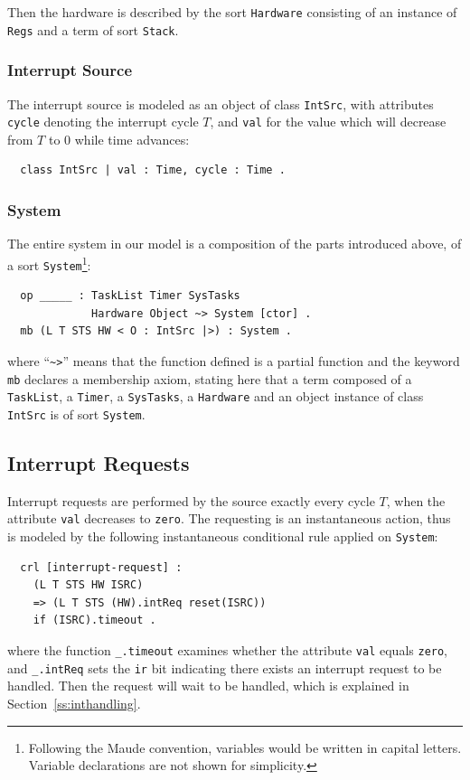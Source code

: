 \documentclass[journal]{IEEEtranTIE}
\begin{document}
Then the hardware is described by the sort \verb|Hardware| consisting
of an instance of \verb|Regs| and a term of sort \verb|Stack|.  

\subsubsection{Interrupt Source}
The interrupt source is modeled as an object of class \verb|IntSrc|,
with attributes \verb|cycle| denoting the interrupt cycle $T$, and
\verb|val| for the value which will decrease from $T$ to $0$ while
time advances:
\begin{verbatim}
  class IntSrc | val : Time, cycle : Time .
\end{verbatim}

\subsubsection{System}
The entire system in our model is a composition of the parts
introduced above, of a sort \verb|System|\footnote{Following the Maude
  convention, variables would be written in capital letters. Variable
  declarations are not shown for simplicity.}:
\begin{verbatim}
  op _____ : TaskList Timer SysTasks 
             Hardware Object ~> System [ctor] .
  mb (L T STS HW < O : IntSrc |>) : System .
\end{verbatim}
where ``\verb|~>|'' means that the function defined is a partial
function and the keyword \verb|mb| declares a membership axiom,
stating here that a term composed of a \verb|TaskList|, a
\verb|Timer|, a \verb|SysTasks|, a \verb|Hardware| and an object
instance of class \verb|IntSrc| is of sort \verb|System|.

\subsection{Interrupt Requests}
\label{ss:ir}
Interrupt requests are performed by the source exactly every cycle
$T$, when the attribute \verb|val| decreases to \verb|zero|. The
requesting is an instantaneous action, thus is modeled by the
following instantaneous conditional rule applied on \verb|System|:
\begin{verbatim}
  crl [interrupt-request] :
    (L T STS HW ISRC) 
    => (L T STS (HW).intReq reset(ISRC))
    if (ISRC).timeout .
\end{verbatim}
where the function \verb|_.timeout| examines whether the attribute
\verb|val| equals \verb|zero|, and \verb|_.intReq| sets the \verb|ir|
bit indicating there exists an interrupt request to be handled.
Then the request will wait to be handled, which is explained in
Section~\ref{ss:inthandling}.
\end{document}
